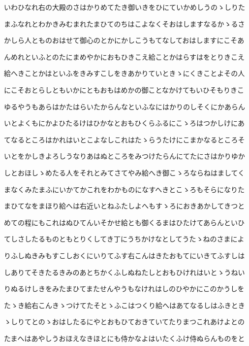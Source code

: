 \documentclass[a4paper,11pt,landscape]{ltjtarticle}
\begin{document}
\par\medskip
いわひなれ右の大殿のさはかりめてたき御いきをひにていかめしうのゝしりた
\par\medskip
まふなれとわかきみむまれたまひてのちはこよなくそおはしますなるかゝるさ
\par\medskip
かしら人とものおはせて御心のとかにかしこうもてなしておはしますにこそあ
\par\medskip
んめれといふとのたにまめやかにおもひきこえ給ことかはらすはをとりきこえ
\par\medskip
給へきことかはといふをきみすこしをきあかりていときゝにくきことよその人
\par\medskip
にこそおとらしともいかにともおもはめかの御ことなかけてもいひそもりきこ
\par\medskip
ゆるやうもあらはかたはらいたからんなといふなにはかりのしそくにかあらん
\par\medskip
いとよくもにかよひたるけはひかなとおもひくらふるにこゝろはつかしけにあ
\par\medskip
てなるところはかれはいとこよなしこれはたゝらうたけにこまかなるところそ
\par\medskip
いとをかしきよろしうなりあはぬところをみつけたらんにてたにさはかりゆか
\par\medskip
しとおほしゝめたる人をそれとみてさてやみ給へき御こゝろならねはましてく
\par\medskip
まなくみたまふにいかてかこれをわかものになすへきとこゝろもそらになりた
\par\medskip
まひてなをまほり給へは右近いとねふたしよへもすゝろにおきあかしてきつと
\par\medskip
めての程にもこれはぬひてんいそかせ給とも御くるまはひたけてあらんといひ
\par\medskip
てしさしたるものともとりくしてき丁にうちかけなとしてうたゝねのさまによ
\par\medskip
りふしぬきみもすこしおくにいりてふす右こんはきたおもてにいきてふすしは
\par\medskip
しありてそきたるきみのあとちかくふしぬねたしとおもひけれはいとゝうねい
\par\medskip
りぬるけしきをみたまひてまたせんやうもなけれはしのひやかにこのかうしを
\par\medskip
たゝき給右こんきゝつけてたそとゝふこはつくり給へはあてなるしはふきとき
\par\medskip
ゝしりてとのゝおはしたるにやとおもひておきていてたりまつこれあけよとの
\par\medskip
たまへはあやしうおほえなきほとにも侍かなよはいたくふけ侍ぬらんものをと
\end{document}
